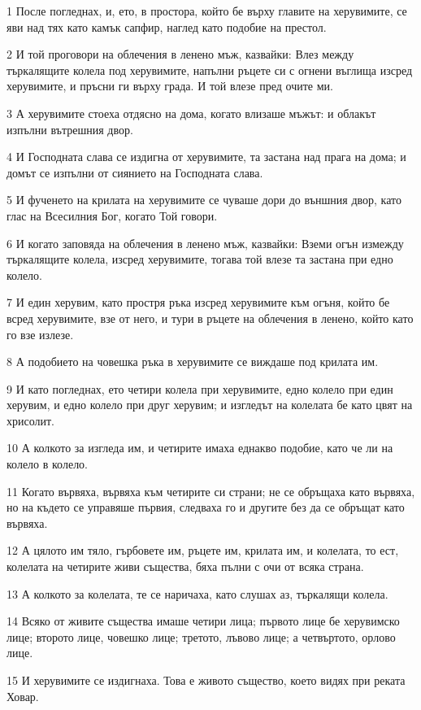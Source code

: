 \par 1 После погледнах, и, ето, в простора, който бе върху главите на херувимите, се яви над тях като камък сапфир, наглед като подобие на престол.
\par 2 И той проговори на облечения в ленено мъж, казвайки: Влез между търкалящите колела под херувимите, напълни ръцете си с огнени въглища изсред херувимите, и пръсни ги върху града. И той влезе пред очите ми.
\par 3 А херувимите стоеха отдясно на дома, когато влизаше мъжът: и облакът изпълни вътрешния двор.
\par 4 И Господната слава се издигна от херувимите, та застана над прага на дома; и домът се изпълни от сиянието на Господната слава.
\par 5 И фученето на крилата на херувимите се чуваше дори до външния двор, като глас на Всесилния Бог, когато Той говори.
\par 6 И когато заповяда на облечения в ленено мъж, казвайки: Вземи огън измежду търкалящите колела, изсред херувимите, тогава той влезе та застана при едно колело.
\par 7 И един херувим, като простря ръка изсред херувимите към огъня, който бе всред херувимите, взе от него, и тури в ръцете на облечения в ленено, който като го взе излезе.
\par 8 А подобието на човешка ръка в херувимите се виждаше под крилата им.
\par 9 И като погледнах, ето четири колела при херувимите, едно колело при един херувим, и едно колело при друг херувим; и изгледът на колелата бе като цвят на хрисолит.
\par 10 А колкото за изгледа им, и четирите имаха еднакво подобие, като че ли на колело в колело.
\par 11 Когато вървяха, вървяха към четирите си страни; не се обръщаха като вървяха, но на където се управяше първия, следваха го и другите без да се обръщат като вървяха.
\par 12 А цялото им тяло, гърбовете им, ръцете им, крилата им, и колелата, то ест, колелата на четирите живи същества, бяха пълни с очи от всяка страна.
\par 13 А колкото за колелата, те се наричаха, като слушах аз, търкалящи колела.
\par 14 Всяко от живите същества имаше четири лица; първото лице бе херувимско лице; второто лице, човешко лице; третото, лъвово лице; а четвъртото, орлово лице.
\par 15 И херувимите се издигнаха. Това е живото същество, което видях при реката Ховар.
